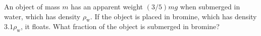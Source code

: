 An object of mass $m$ has an apparent weight $(3/5)mg$ when submerged
in water, which has density $\rho_\text{w}$. If the object is placed
in bromine, which has density $3.1\rho_\text{w}$, it floats. What fraction
of the object is submerged in bromine?\answercheck
